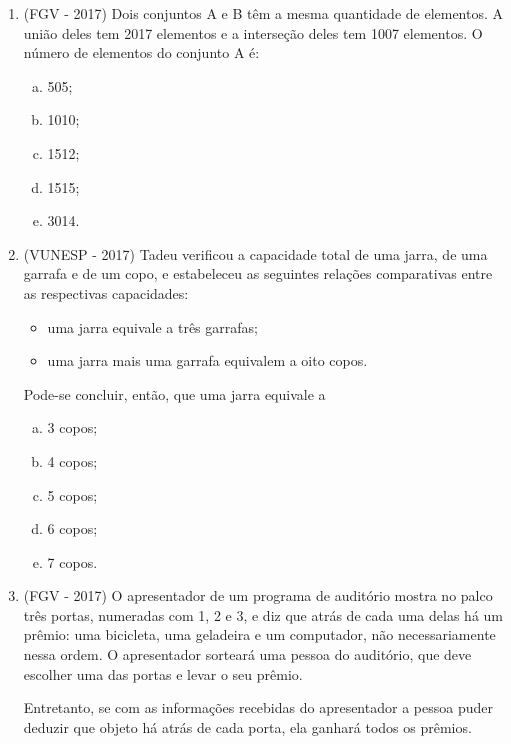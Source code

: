 \begin{enumerate}
\item (FGV - 2017) Dois conjuntos A e B têm a mesma quantidade de elementos. A união deles tem 2017 elementos e a interseção deles tem 1007 elementos. O número de elementos do conjunto A é:
\begin{multicols}{2}
\begin{enumerate}[a)]
\item 505;
\item 1010;
\item 1512;
\item 1515;
\item 3014.
\end{enumerate}
\end{multicols}

\item (VUNESP - 2017) Tadeu verificou a capacidade total de uma jarra, de uma garrafa e de um copo, e estabeleceu as seguintes relações comparativas entre as respectivas capacidades:
\begin{itemize}
\item uma jarra equivale a três garrafas;
\item uma jarra mais uma garrafa equivalem a oito copos.
\end{itemize}
Pode-se concluir, então, que uma jarra equivale a
\begin{multicols}{2}
\begin{enumerate}[a)]
\item 3 copos;
\item 4 copos;
\item 5 copos;
\item 6 copos;
\item 7 copos.
\end{enumerate}
\end{multicols}

\item (FGV - 2017) O apresentador de um programa de auditório mostra no palco três portas, numeradas com 1, 2 e 3, e diz que atrás de cada uma delas há um prêmio: uma bicicleta, uma geladeira e um computador, não necessariamente nessa ordem. O apresentador sorteará uma pessoa do auditório, que deve escolher uma das portas e levar o seu prêmio.

Entretanto, se com as informações recebidas do apresentador a pessoa puder deduzir que objeto há atrás de cada porta, ela ganhará todos os prêmios.


\end{enumerate}
